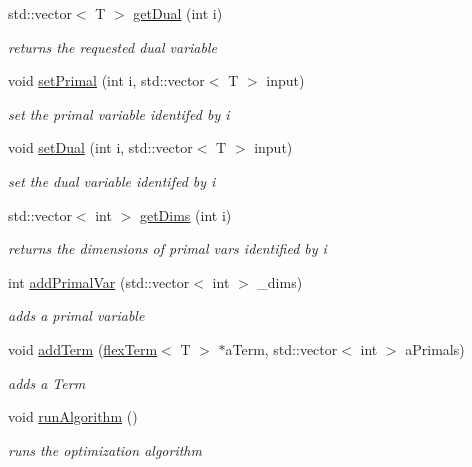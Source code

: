 \begin{DoxyCompactItemize}
std\+::vector$<$ T $>$ \hyperlink{classflex_box_a72828fae47030668e63637f232ed2beb}{get\+Dual} (int i)
\begin{DoxyCompactList}\small\item\em returns the requested dual variable \end{DoxyCompactList}\item 
void \hyperlink{classflex_box_aacb08dc862943d6bb24353a62e2c9341}{set\+Primal} (int i, std\+::vector$<$ T $>$ input)
\begin{DoxyCompactList}\small\item\em set the primal variable identifed by i \end{DoxyCompactList}\item 
void \hyperlink{classflex_box_a77e4f589d87b7c34170778c9abbea3b3}{set\+Dual} (int i, std\+::vector$<$ T $>$ input)
\begin{DoxyCompactList}\small\item\em set the dual variable identifed by i \end{DoxyCompactList}\item 
std\+::vector$<$ int $>$ \hyperlink{classflex_box_a4007f118251e0d9787b373709b498785}{get\+Dims} (int i)
\begin{DoxyCompactList}\small\item\em returns the dimensions of primal vars identified by i \end{DoxyCompactList}\item 
int \hyperlink{classflex_box_a659aac107b85ecf64c9fd1aaa465a98d}{add\+Primal\+Var} (std\+::vector$<$ int $>$ \+\_\+dims)
\begin{DoxyCompactList}\small\item\em adds a primal variable \end{DoxyCompactList}\item 
void \hyperlink{classflex_box_a4cba554c506d130824ace967bae82ac3}{add\+Term} (\hyperlink{classflex_term}{flex\+Term}$<$ T $>$ $\ast$a\+Term, std\+::vector$<$ int $>$ a\+Primals)
\begin{DoxyCompactList}\small\item\em adds a Term \end{DoxyCompactList}\item 
\mbox{\label{classflex_box_a796367904304f13a82c9fe729c4924d9}} 
void \hyperlink{classflex_box_a796367904304f13a82c9fe729c4924d9}{run\+Algorithm} ()
\begin{DoxyCompactList}\small\item\em runs the optimization algorithm \end{DoxyCompactList}\end{DoxyCompactItemize}
